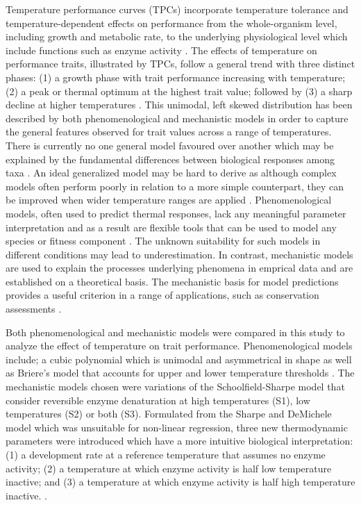 \documentclass[11pt]{article}
\begin{document}
\begin{linenumbers}
 
Temperature performance curves (TPCs) incorporate temperature tolerance and temperature-dependent effects on performance from the whole-organism level, including growth and metabolic rate, to the underlying physiological level which include functions such as enzyme activity \cite{10.1093/icb/icr097}\cite{doi:10.1890/12-2060.1}. The effects of temperature on performance traits, illustrated by TPCs, follow a general trend
with three distinct phases: (1) a growth phase with trait performance increasing with temperature; (2) a peak or thermal optimum at the highest trait value; followed by (3) a sharp decline at higher temperatures \cite{Schulte2015}. This unimodal, left skewed distribution has been described by both phenomenological and mechanistic models in order to capture the general features observed for trait values across a range of temperatures. There is currently no one general model favoured over another which may be explained by the fundamental differences between biological responses among taxa \cite{pub.1026914980}\cite{doi:10.1002/ece3.3576}. An ideal generalized model may be hard to derive as although complex models often perform poorly in relation to a more simple counterpart, they can be improved when wider temperature ranges are applied \cite{Quinn2017ACR}. Phenomenological models, often used to predict thermal responses, lack any meaningful parameter interpretation and as a result are flexible tools that can be used to model any species or fitness component \cite{Martin2017PhenomenologicalVB}. The unknown suitability for such models in different conditions may lead to underestimation. In contrast, mechanistic models are used to explain the processes underlying phenomena in emprical data and are established on a theoretical basis. The mechanistic basis for model predictions provides a useful criterion in a range of applications, such as conservation assessments \cite{doi:10.1098/rsbl.2005.0417}. 

Both phenomenological and mechanistic models were compared in this study to analyze the effect of temperature on trait performance. Phenomenological models include; a cubic polynomial which is unimodal and asymmetrical in shape as well as Briere's model that accounts for upper and lower temperature thresholds \cite{10.1093/ee/28.1.22}. The mechanistic models chosen were variations of the Schoolfield-Sharpe model that consider  reversible enzyme denaturation at high temperatures (S1), low temperatures (S2) or both (S3).
Formulated from the Sharpe and DeMichele model which was unsuitable for non-linear regression, three new thermodynamic parameters were introduced which have a more intuitive biological interpretation: (1) a development rate at a reference temperature that assumes no enzyme activity; (2) a temperature at which enzyme activity is half low temperature inactive; and (3) a temperature at which enzyme activity is half high temperature inactive. \cite{Schoolfield1981}.


\end{linenumbers}
\end{document}
